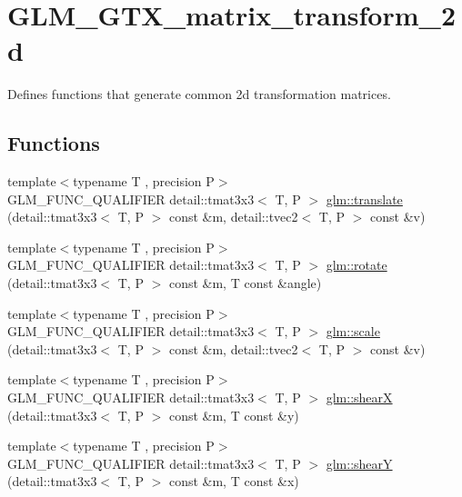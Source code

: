 \hypertarget{group__gtx__matrix__transform__2d}{}\section{G\+L\+M\+\_\+\+G\+T\+X\+\_\+matrix\+\_\+transform\+\_\+2d}
\label{group__gtx__matrix__transform__2d}


Defines functions that generate common 2d transformation matrices.  


\subsection*{Functions}
\begin{DoxyCompactItemize}
\item 
{\footnotesize template$<$typename T , precision P$>$ }\\G\+L\+M\+\_\+\+F\+U\+N\+C\+\_\+\+Q\+U\+A\+L\+I\+F\+I\+ER detail\+::tmat3x3$<$ T, P $>$ \hyperlink{group__gtx__matrix__transform__2d_gaa73c0e940e66b4e8aebf9dc72f5a7e34}{glm\+::translate} (detail\+::tmat3x3$<$ T, P $>$ const \&m, detail\+::tvec2$<$ T, P $>$ const \&v)
\item 
{\footnotesize template$<$typename T , precision P$>$ }\\G\+L\+M\+\_\+\+F\+U\+N\+C\+\_\+\+Q\+U\+A\+L\+I\+F\+I\+ER detail\+::tmat3x3$<$ T, P $>$ \hyperlink{group__gtx__matrix__transform__2d_gae172cd1e33a5c7b82c69a9731eac6c67}{glm\+::rotate} (detail\+::tmat3x3$<$ T, P $>$ const \&m, T const \&angle)
\item 
{\footnotesize template$<$typename T , precision P$>$ }\\G\+L\+M\+\_\+\+F\+U\+N\+C\+\_\+\+Q\+U\+A\+L\+I\+F\+I\+ER detail\+::tmat3x3$<$ T, P $>$ \hyperlink{group__gtx__matrix__transform__2d_gaf17588e16120250980b221c2ebdde0eb}{glm\+::scale} (detail\+::tmat3x3$<$ T, P $>$ const \&m, detail\+::tvec2$<$ T, P $>$ const \&v)
\item 
{\footnotesize template$<$typename T , precision P$>$ }\\G\+L\+M\+\_\+\+F\+U\+N\+C\+\_\+\+Q\+U\+A\+L\+I\+F\+I\+ER detail\+::tmat3x3$<$ T, P $>$ \hyperlink{group__gtx__matrix__transform__2d_gaeac73f42bba3e35100d9a43c40dc0f23}{glm\+::shearX} (detail\+::tmat3x3$<$ T, P $>$ const \&m, T const \&y)
\item 
{\footnotesize template$<$typename T , precision P$>$ }\\G\+L\+M\+\_\+\+F\+U\+N\+C\+\_\+\+Q\+U\+A\+L\+I\+F\+I\+ER detail\+::tmat3x3$<$ T, P $>$ \hyperlink{group__gtx__matrix__transform__2d_ga04dd04815c1c8ee0bd49e6ae499d8252}{glm\+::shearY} (detail\+::tmat3x3$<$ T, P $>$ const \&m, T const \&x)
\end{DoxyCompactItemize}


